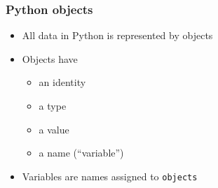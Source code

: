 \documentclass[xcolor=table,10pt,final]{beamer}
\begin{document}
\begin{frame}[fragile]
  \frametitle{Python objects}
  \begin{itemize}
    \item All data in Python is represented by objects
    \item Objects have
      \begin{itemize}
        \item an identity
        \item a type
        \item a value
        \item a name (``variable'')
      \end{itemize}
    \item Variables are names assigned to {\tt objects}
  \end{itemize}
\end{frame}
\end{document}
